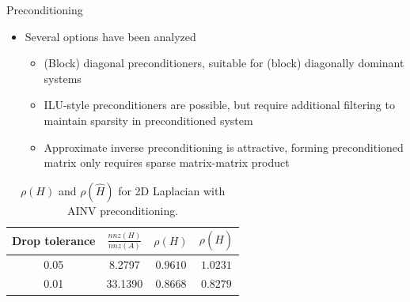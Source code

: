 \documentclass{beamer}
\begin{document}
\begin{frame}{Preconditioning}
  \begin{itemize}
    \item Several options have been analyzed
      \begin{itemize}
        \item (Block) diagonal preconditioners, suitable for (block)
          diagonally dominant systems
        \item ILU-style preconditioners are possible, but require additional
          filtering to maintain sparsity in preconditioned system
        \item Approximate inverse preconditioning is attractive, forming
          preconditioned matrix only requires sparse matrix-matrix product
      \end{itemize}
  \end{itemize}

  \begin{table}[!h]
  \centering
  \begin{tabular}{|c|c|c|c|}
  \hline
  \textbf{Drop tolerance} & \textbf{$\frac{nnz(H)}{nnz(A)}$}& $\rho(H)$
  &$\rho(\hat{H})$\\
  \hline
   0.05 & 8.2797 & $0.9610$ & $1.0231$\\
  \hline
   0.01 & 33.1390 & $0.8668$ & $0.8279$\\
  \hline
  \end{tabular}
  \caption{$\rho(H)$ and $\rho(\hat{H})$ for 2D
  Laplacian with AINV preconditioning.}
  \label{tab:lap2d_ainv}
  \end{table}
\end{frame}

\end{document}
